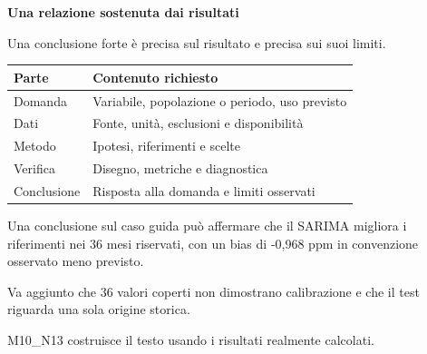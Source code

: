 \documentclass[12pt,aspectratio=1610]{beamer}
\newcommand{\PBody}[1]{\par{\fontsize{11.3}{14.8}\selectfont #1\par}}
\newcommand{\PSmall}[1]{\par{\fontsize{9.8}{13.1}\selectfont #1\par}}
\newcommand{\PInfo}[1]{%
\begin{tcolorbox}[enhanced,arc=1.6mm,boxrule=.55pt,colback=GeoTint,
 colframe=Rule!80!Classical,left=2.3mm,right=2.3mm,top=2mm,bottom=2mm,
 before skip=1mm,after skip=1mm]
\PSmall{#1}\end{tcolorbox}}
\begin{document}
\begin{frame}[plain]\hypertarget{slide106}{}
\begin{lrbox}{\TitleBox}
\begin{minipage}[t]{17.7cm}\raggedright\color{Ink}\fontsize{11.3}{14.8}\selectfont
\color{Navy}\bfseries\fontsize{20.6}{24.5}\selectfont Una relazione sostenuta dai risultati
\end{minipage}\end{lrbox}

\begin{lrbox}{\RecallBox}
\begin{minipage}[t]{14.3cm}\raggedright\color{Ink}\fontsize{11.3}{14.8}\selectfont
\fontsize{10.3}{13.8}\selectfont Una conclusione forte è precisa sul risultato e precisa sui suoi limiti.
\end{minipage}\end{lrbox}

\begin{lrbox}{\PilotLeftBox}
\begin{minipage}[t]{10.05cm}\raggedright\color{Ink}\fontsize{11.3}{14.8}\selectfont
{\fontsize{10.2}{13.1}\selectfont\renewcommand{\arraystretch}{1.45}\begin{tabular}{@{}p{2.6cm}p{6.4cm}@{}}\toprule
\textbf{Parte} & \textbf{Contenuto richiesto}\\\midrule
Domanda & Variabile, popolazione o periodo, uso previsto\\
Dati & Fonte, unità, esclusioni e disponibilità\\
Metodo & Ipotesi, riferimenti e scelte\\
Verifica & Disegno, metriche e diagnostica\\
Conclusione & Risposta alla domanda e limiti osservati\\
\bottomrule\end{tabular}}

\end{minipage}\end{lrbox}

\begin{lrbox}{\PilotRightBox}
\begin{minipage}[t]{7.55cm}\raggedright\color{Ink}\fontsize{11.3}{14.8}\selectfont
\PBody{Una conclusione sul caso guida può affermare che il SARIMA migliora i riferimenti nei 36 mesi riservati, con un bias di -0,968 ppm in convenzione osservato meno previsto.}
\vspace{2.5mm}
\PInfo{Va aggiunto che 36 valori coperti non dimostrano calibrazione e che il test riguarda una sola origine storica.}
\PSmall{M10\_N13 costruisce il testo usando i risultati realmente calcolati.}


\end{minipage}
\end{lrbox}
\end{frame}
\end{document}
